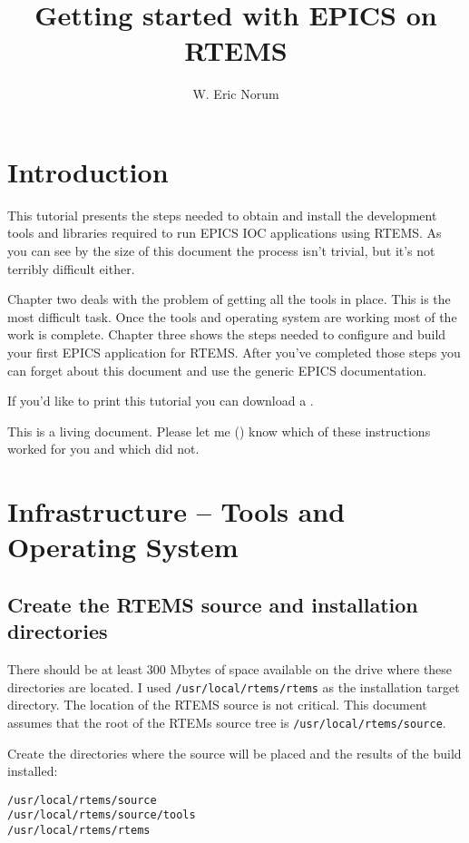 \documentclass{report}
\title{Getting started with EPICS on RTEMS}
\author{W. Eric Norum}
\begin{document}
\maketitle
\newpage
{}
\tableofcontents
\newpage
{}

\chapter{Introduction}
This tutorial presents the steps needed to obtain and install
the development tools and
libraries required  to run EPICS IOC applications using RTEMS.
As you can see by the size of this document the process isn't trivial,
but it's not terribly difficult either.

Chapter two deals with the problem of getting all the tools in place.  This
is the most difficult task.  Once the tools and operating system are working
most of the work is complete.  Chapter three shows the steps needed to
configure and build your first EPICS application for RTEMS.  After you've
completed those steps you can forget about this document and use the
generic EPICS documentation.

\begin{htmlonly}
If you'd like to print this tutorial you can download a
.
\end{htmlonly}


This is a living document.  Please let me
()
know which of these instructions worked for you and which did not.


\chapter{Infrastructure -- Tools and Operating System}
\section{Create the RTEMS source and installation directories}
There should be at least 300 Mbytes of space available on the drive
where these directories are located.
I used {\tt /usr/local/rtems/rtems\rtemsToolVersion} as the
installation target directory.
The location of the RTEMS source is not critical.  This document assumes
that the root of the RTEMs source tree is {\tt /usr/local/rtems/source}.

Create the directories where the source will be placed
and the results of the build installed:
\begin{alltt}
/usr/local/rtems/source
/usr/local/rtems/source/tools
/usr/local/rtems/rtems\rtemsToolVersion
\end{alltt}
\end{document}
